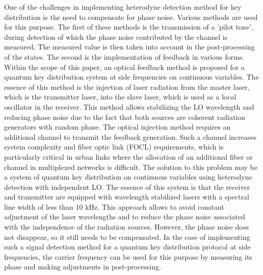 One of the challenges in implementing heterodyne detection method for key distribution is the need to compensate for phase noise. Various methods are used for this purpose. The first of these methods is the transmission of a 'pilot tone', during detection of which the phase noise contributed by the channel is measured. The measured value is then taken into account in the post-processing of the states. The second is the implementation of feedback in various forms. Within the scope of this paper, an optical feedback method is proposed for a quantum key distribution system at side frequencies on continuous variables. The essence of this method is the injection of laser radiation from the master laser, which is the transmitter laser, into the slave laser, which is used as a local oscillator in the receiver. This method allows stabilizing the LO wavelength and reducing phase noise due to the fact that both sources are coherent radiation generators with random phase.
The optical injection method requires an additional channel to transmit the feedback generation. Such a channel increases system complexity and fiber optic link (FOCL) requirements, which is particularly critical in urban links where the allocation of an additional fiber or channel in multiplexed networks is difficult. The solution to this problem may be a system of quantum key distribution on continuous variables using heterodyne detection with independent LO. The essence of this system is that the receiver and transmitter are equipped with wavelength stabilized lasers with a spectral line width of less than 10 kHz. This approach allows to avoid constant adjustment of the laser wavelengths and to reduce the phase noise associated with the independence of the radiation sources.
However, the phase noise does not disappear, so it still needs to be compensated. In the case of implementing such a signal detection method for a quantum key distribution protocol at side frequencies, the carrier frequency can be used for this purpose by measuring its phase and making adjustments in post-processing. 

